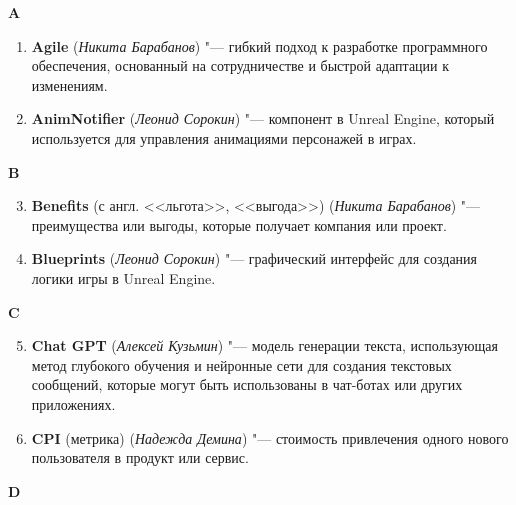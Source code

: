 \begin{flushleft} \large\textbf{A} \end{flushleft}

\begin{enumerate}
    \setcounter{enumi}{0}

    \item \textbf{Agile} (\textit{Никита Барабанов}) "--- гибкий подход к разработке программного обеспечения, основанный на сотрудничестве и быстрой адаптации к изменениям.
    
    \item \textbf{AnimNotifier} (\textit{Леонид Сорокин}) "--- компонент в Unreal Engine, который используется для управления анимациями персонажей в играх. 
\end{enumerate}

\begin{flushleft} \large\textbf{B} \end{flushleft}

\begin{enumerate}
    \setcounter{enumi}{2}

    \item \textbf{Benefits} (с англ. <<льгота>>, <<выгода>>) (\textit{Никита Барабанов}) "--- преимущества или выгоды, которые получает компания или проект. 
    
    \item \textbf{Blueprints} (\textit{Леонид Сорокин}) "--- графический интерфейс для создания логики игры в Unreal Engine. 
\end{enumerate}

\begin{flushleft} \large\textbf{C} \end{flushleft}

\begin{enumerate}
    \setcounter{enumi}{4}

    \item \textbf{Chat GPT} (\textit{Алексей Кузьмин}) "--- 
    модель генерации текста, использующая метод глубокого обучения и нейронные сети для создания текстовых сообщений, которые могут быть использованы в чат-ботах или других приложениях. 

    \item \textbf{CPI} (метрика) (\textit{Надежда Демина}) "--- 
    стоимость привлечения одного нового пользователя в продукт или сервис. 
\end{enumerate}

\begin{flushleft} \large\textbf{D} \end{flushleft}

